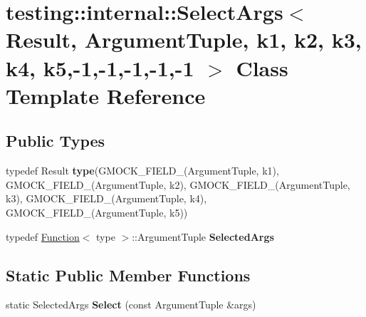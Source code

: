 \hypertarget{classtesting_1_1internal_1_1SelectArgs_3_01Result_00_01ArgumentTuple_00_01k1_00_01k2_00_01k3_00_03a25384b3e8dae1359a943456ce6fe0}{}\section{testing\+:\+:internal\+:\+:Select\+Args$<$ Result, Argument\+Tuple, k1, k2, k3, k4, k5,-\/1,-\/1,-\/1,-\/1,-\/1 $>$ Class Template Reference}
\label{classtesting_1_1internal_1_1SelectArgs_3_01Result_00_01ArgumentTuple_00_01k1_00_01k2_00_01k3_00_03a25384b3e8dae1359a943456ce6fe0}
\subsection*{Public Types}
\begin{DoxyCompactItemize}
\item 
typedef Result {\bfseries type}(G\+M\+O\+C\+K\+\_\+\+F\+I\+E\+L\+D\+\_\+(Argument\+Tuple, k1), G\+M\+O\+C\+K\+\_\+\+F\+I\+E\+L\+D\+\_\+(Argument\+Tuple, k2), G\+M\+O\+C\+K\+\_\+\+F\+I\+E\+L\+D\+\_\+(Argument\+Tuple, k3), G\+M\+O\+C\+K\+\_\+\+F\+I\+E\+L\+D\+\_\+(Argument\+Tuple, k4), G\+M\+O\+C\+K\+\_\+\+F\+I\+E\+L\+D\+\_\+(Argument\+Tuple, k5))\hypertarget{classtesting_1_1internal_1_1SelectArgs_3_01Result_00_01ArgumentTuple_00_01k1_00_01k2_00_01k3_00_03a25384b3e8dae1359a943456ce6fe0_aadb1557e45bff523a2d0abe5a539a58d}{}\label{classtesting_1_1internal_1_1SelectArgs_3_01Result_00_01ArgumentTuple_00_01k1_00_01k2_00_01k3_00_03a25384b3e8dae1359a943456ce6fe0_aadb1557e45bff523a2d0abe5a539a58d}

\item 
typedef \hyperlink{structtesting_1_1internal_1_1Function}{Function}$<$ type $>$\+::Argument\+Tuple {\bfseries Selected\+Args}\hypertarget{classtesting_1_1internal_1_1SelectArgs_3_01Result_00_01ArgumentTuple_00_01k1_00_01k2_00_01k3_00_03a25384b3e8dae1359a943456ce6fe0_a96d3b235ab6a72004f4fe2492a3ddd66}{}\label{classtesting_1_1internal_1_1SelectArgs_3_01Result_00_01ArgumentTuple_00_01k1_00_01k2_00_01k3_00_03a25384b3e8dae1359a943456ce6fe0_a96d3b235ab6a72004f4fe2492a3ddd66}

\end{DoxyCompactItemize}
\subsection*{Static Public Member Functions}
\begin{DoxyCompactItemize}
\item 
static Selected\+Args {\bfseries Select} (const Argument\+Tuple \&args)\hypertarget{classtesting_1_1internal_1_1SelectArgs_3_01Result_00_01ArgumentTuple_00_01k1_00_01k2_00_01k3_00_03a25384b3e8dae1359a943456ce6fe0_a154410b3b018654effefc81b33a3ee82}{}\label{classtesting_1_1internal_1_1SelectArgs_3_01Result_00_01ArgumentTuple_00_01k1_00_01k2_00_01k3_00_03a25384b3e8dae1359a943456ce6fe0_a154410b3b018654effefc81b33a3ee82}

\end{DoxyCompactItemize}



